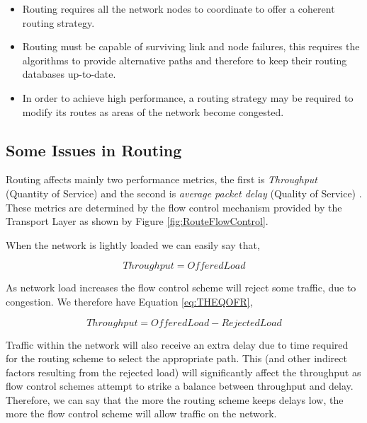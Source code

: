 \begin{itemize}
 \item Routing requires all the network nodes to coordinate to offer a coherent routing strategy.
 \item Routing must be capable of surviving link and node failures, this requires the algorithms to provide alternative paths and therefore to keep their routing databases up-to-date.
 \item In order to achieve high performance, a routing strategy may be required to modify its routes as areas of the network become congested.
\end{itemize}

\subsection{Some Issues in Routing}


Routing affects mainly two performance metrics, the first is \textit{Throughput} (Quantity of Service) and the second is \textit{average packet delay} (Quality of Service) \cite{DataNetworks}. These metrics are determined by the flow control mechanism provided by the Transport Layer as shown by Figure \ref{fig:RouteFlowControl}. 

                
When the network is lightly loaded we can easily say that,

\begin{equation}
  Throughput = Offered Load
  \label{eq:THEQOF}
\end{equation}

As network load increases the flow control scheme will reject some traffic, due to congestion. We therefore have Equation \ref{eq:THEQOFR},

\begin{equation}
  Throughput = Offered Load - Rejected Load
  \label{eq:THEQOFR}
\end{equation}

Traffic within the network will also receive an extra delay due to time required for the routing scheme to select the appropriate path. This (and other indirect factors resulting from the rejected load) will significantly affect the throughput as flow control schemes attempt to strike a balance between throughput and delay. Therefore, we can say that the more the routing scheme keeps delays low, the more the flow control scheme will allow traffic on the network.

